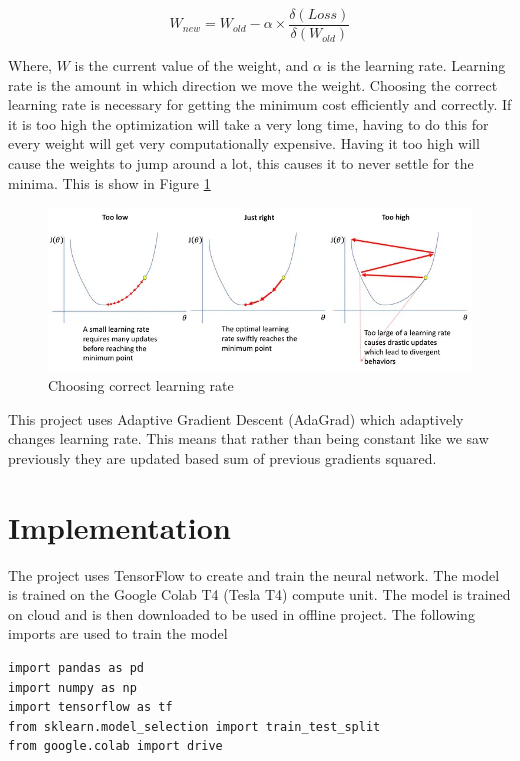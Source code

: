 \documentclass[a4paper,oneside,12pt]{report}
\begin{document}
\[ W_{new} = W_{old} - \alpha \times \frac{\delta (Loss)}{\delta (W_{old})}\]

Where, \(W\) is the current value of the weight, and \(\alpha\) is the learning rate. Learning rate is the amount in which direction we move the weight. Choosing the correct learning rate is necessary for getting the minimum cost efficiently and correctly. If it is too high the optimization will take a very long time, having to do this for every weight will get very computationally expensive. Having it too high will cause the weights to jump around a lot, this causes it to never settle for the minima. This is show in Figure \ref{fig:orge336482} 

\begin{figure}[htbp]
\centering
\includegraphics[width=.9\linewidth]{Neural_Network/2025-04-27_02-45-46_learning_rates.png}
\caption{\label{fig:orge336482}Choosing correct learning rate}
\end{figure}

This project uses Adaptive Gradient Descent (AdaGrad) which adaptively changes learning rate. This means that rather than being constant like we saw previously they are updated based sum of previous gradients squared.
\section{Implementation}
\label{sec:org6683db2}
The project uses TensorFlow to create and train the neural network. The model is trained on the Google Colab T4 (Tesla T4) compute unit. The model is trained on cloud and is then downloaded to be used in offline project. The following imports are used to train the model

\begin{verbatim}
import pandas as pd 
import numpy as np
import tensorflow as tf
from sklearn.model_selection import train_test_split
from google.colab import drive
\end{verbatim}
\end{document}
